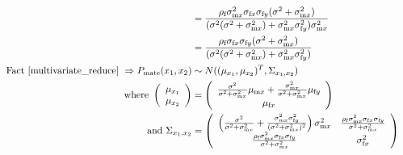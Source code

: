 \documentclass{article}
\newcommand{\x}[1]{\text{#1}}
\begin{document}
\begin{align*}
\\&=\frac{\rho_\x{f}\sigma_{\x{m}x}^2\sigma_{\x{f}x}\sigma_{\x{f}y}(\sigma^2+\sigma_{\x{m}x}^2)}{(\sigma^2(\sigma^2+\sigma_{\x{m}x}^2)+\sigma_{\x{m}x}^2\sigma_{\x{f}y}^2)\sigma_{\x{m}x}^2}
\\&=\frac{\rho_\x{f}\sigma_{\x{f}x}\sigma_{\x{f}y}(\sigma^2+\sigma_{\x{m}x}^2)}{(\sigma^2(\sigma^2+\sigma_{\x{m}x}^2)+\sigma_{\x{m}x}^2\sigma_{\x{f}y}^2)}
\\ \text{ Fact \ref{multivariate_reduce} } \Rightarrow P_\text{mate}(x_1,x_2)&\sim N((\mu_{x_1},\mu_{x_2})^T,\Sigma_{x_1,x_2})
\\ \text{ where } \left(\begin{array}{c}\mu_{x_1} \\ \mu_{x_2} \end{array}\right)&=\left(\begin{array}{c}\frac{\sigma^2}{\sigma^2+\sigma_{\x{m}x}^2}\mu_{\x{m}x}+\frac{\sigma_{\x{m}x}^2}{\sigma^2+\sigma_{\x{m}x}^2}\mu_{\x{f}y} \\ \mu_{\x{f}x} \end{array}\right)
\\\text{ and } \Sigma_{x_1,x_2}&=\left(\begin{array}{cc}\left(\frac{\sigma^2}{\sigma^2+\sigma_{\x{m}x}^2}+\frac{\sigma_{\x{m}x}^2\sigma_{\x{f}y}^2}{(\sigma^2+\sigma_{\x{m}x}^2)^2}\right)\sigma_{\x{m}x}^2 & \frac{\rho_\x{f}\sigma_{\x{m}x}^2\sigma_{\x{f}x}\sigma_{\x{f}y}}{\sigma^2+\sigma_{\x{m}x}^2}
\\\frac{\rho_\x{f}\sigma_{\x{m}x}^2\sigma_{\x{f}x}\sigma_{\x{f}y}}{\sigma^2+\sigma_{\x{m}x}^2}& \sigma_{\x{f}x}^2 \end{array}\right)
\end{align*}
\end{document}
